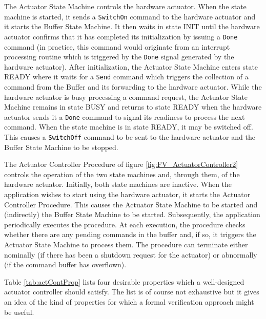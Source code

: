 \documentclass[a4paper,10pt]{article}
\begin{document}
The Actuator State Machine controls the hardware actuator. When the state machine is started, it sends a \texttt{SwitchOn} command to the hardware actuator and it starts the Buffer State Machine. It then waits in state INIT until the hardware actuator confirms that it has completed its initialization by issuing a \texttt{Done} command (in practice, this command would originate from an interrupt processing routine which is triggered by the \texttt{Done} signal generated by the hardware actuator). After initialization, the Actuator State Machine enters state READY where it waits for a \texttt{Send} command which triggers the collection of a command from the Buffer and its forwarding to the hardware actuator. While the hardware actuator is busy processing a command request, the Actuator State Machine remains in state BUSY and returns to state READY when the hardware actuator sends it a \texttt{Done} command to signal its readiness to process the next command. When the state machine is in state READY, it may be switched off. This causes a \texttt{SwitchOff} command to be sent to the hardware actuator and the Buffer State Machine to be stopped.

The Actuator Controller Procedure of figure \ref{fig:FV_ActuatorController2} controls the operation of the two state machines and, through them, of the hardware actuator. Initially, both state machines are inactive. When the application wishes to start using the hardware actuator, it starts the Actuator Controller Procedure. This causes the Actuator State Machine to be started and (indirectly) the Buffer State Machine to be started. Subsequently, the application periodically executes the procedure. At each execution, the procedure checks whether there are any pending commands in the buffer and, if so, it triggers the Actuator State Machine to process them. The procedure can terminate either nominally (if there has been a shutdown request for the actuator) or abnormally (if the command buffer has overflown).  

Table \ref{tab:actContProp} lists four desirable properties which a well-designed actuator controller should satisfy. The list is of course not exhaustive but it gives an idea of the kind of properties for which a formal verification approach might be useful.  
\end{document}
